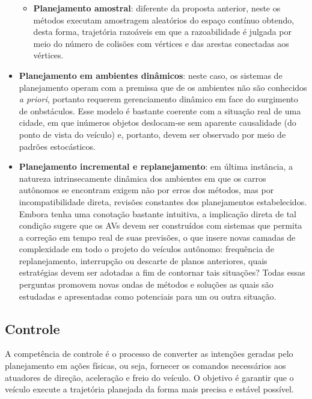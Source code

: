 \begin{itemize}
\begin{itemize}
        \item \textbf{Planejamento amostral}: diferente da proposta anterior, neste os métodos executam amostragem aleatórios do espaço contínuo obtendo, desta forma, trajetória razoáveis em que a razoabilidade é julgada por meio do número de colisões com vértices e das arestas conectadas aos vértices.
    \end{itemize}
    \item \textbf{Planejamento em ambientes dinâmicos}: neste caso, os sistemas de planejamento operam com a premissa que de os ambientes não são conhecidos \textit{a priori}, portanto requerem gerenciamento dinâmico em face do surgimento de onbstáculos. Esse modelo é bastante coerente com a situação real de uma cidade, em que inúmeros objetos deslocam-se sem aparente causalidade (do ponto de vista do veículo) e, portanto, devem ser observado por meio de padrões estocásticos.
    \item \textbf{Planejamento incremental e replanejamento}: em última instância, a natureza intrinsecamente dinâmica dos ambientes em que os carros autônomos se encontram exigem não por erros dos métodos, mas por incompatibilidade direta, revisões constantes dos planejamentos estabelecidos. Embora tenha uma conotação bastante intuitiva, a implicação direta de tal condição sugere que os AVs devem ser construídos com sistemas que permita a correção em tempo real de suas previsões, o que insere novas camadas de complexidade em todo o projeto do veículos autônomo: frequência de replanejamento, interrupção ou descarte de planos anteriores, quais estratégias devem ser adotadas a fim de contornar tais situações? Todas essas perguntas promovem novas ondas de métodos e soluções as quais são estudadas e apresentadas como potenciais para um ou outra situação.
\end{itemize}

\subsection{Controle}

A competência de controle é o processo de converter as intenções geradas pelo planejamento em ações físicas, ou seja, fornecer os comandos necessários aos atuadores de direção, aceleração e freio do veículo. O objetivo é garantir que o veículo execute a trajetória planejada da forma mais precisa e estável possível.

